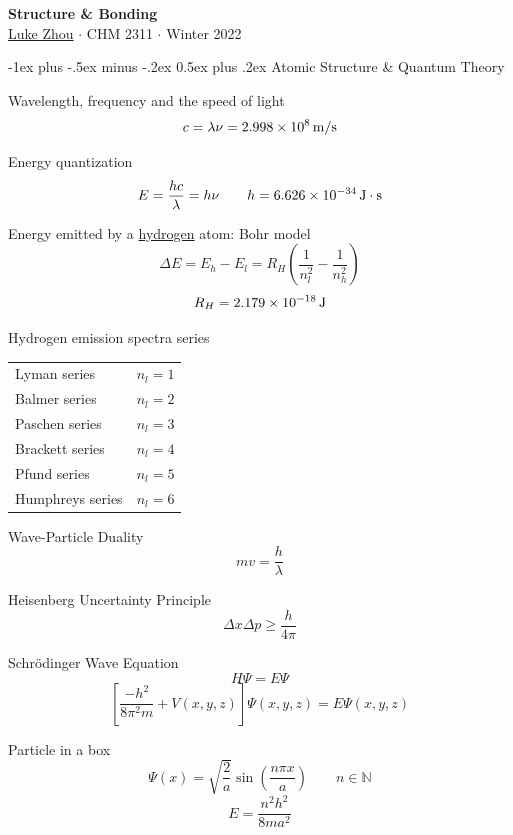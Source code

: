\documentclass[10pt,landscape]{article}
\makeatletter
\renewcommand{\section}{\@startsection{section}{1}{0mm}%
                                {-1ex plus -.5ex minus -.2ex}%
                                {0.5ex plus .2ex}%
                                {\normalfont\large\bfseries}}
\newcommand{\extraline}{\vspace{1em}}
\newcommand{\tableindent}{\hspace{1.5em}}
\makeatother
\begin{document}
\raggedright
\footnotesize
\begin{multicols}{3}

\setlength{\premulticols}{1pt}
\setlength{\postmulticols}{1pt}
\setlength{\multicolsep}{1pt}
\setlength{\columnsep}{2pt}

\begin{center}
     \Large{\textbf{Structure \& Bonding}} \\
     \small{\href{https://github.com/zhouluke/PhysicsFormulas}{Luke Zhou} $\cdot$ CHM 2311 $\cdot$ Winter 2022}
\end{center}

\section{Atomic Structure \& Quantum Theory}

Wavelength, frequency and the speed of light
\[ c = \lambda\nu  = \SI{2.998E8}{\meter/\second}  \]

Energy quantization
\[E = \frac{hc}{\lambda} = h\nu  \qquad
 h = \SI{6.626E-34}{\joule\cdot\second}  \]

Energy emitted by a \underline{hydrogen} atom: Bohr model
 \[ \Delta E = E_{h} - E_{l} = R_H \left(  \frac{1}{n_l^2} - \frac{1}{n_h^2} \right) \] 
 \[ R_H =  \SI{2.179E-18}{\joule} \]

Hydrogen emission spectra series \\
\begin{tabular}{@{\tableindent}ll@{}}
	Lyman series & $n_l = 1$ \\
	Balmer series & $n_l = 2$ \\
	Paschen series & $n_l = 3$ \\
	Brackett series & $n_l = 4$ \\
	Pfund series & $n_l = 5$ \\
	Humphreys series & $n_l = 6$ \\
\end{tabular}
\extraline

Wave-Particle Duality  
\[  mv = \frac{h}{\lambda} \]


Heisenberg Uncertainty Principle
\[  \Delta x \Delta p \geq \frac{h}{4\pi} \]

Schrödinger Wave Equation
\[ H\Psi = E\Psi  \]
\[ \left[ \frac{-h^2}{8\pi^2m} +
V(x,y,z)\right] \Psi(x,y,z) = E\Psi(x,y,z)  \]
	
Particle in a box
\[ \Psi(x) = \sqrt{\frac{2}{a}} \sin\left( \frac{n\pi x}{a} \right)  \qquad n \in \mathbb{N} \]
\[ E = \frac{n^2h^2}{8ma^2} \]


\end{multicols}
\end{document}
